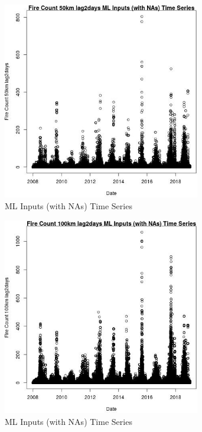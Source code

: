 \begin{figure} 
\centering  
\includegraphics[width=0.77\textwidth]{Code_Outputs/Report_ML_input_PM25_Step4_part_f_de_duplicated_aves_prioritize_24hr_obswNAs_Fire_Count_50km_lag2daysvDate.jpg} 
\caption{\label{fig:Report_ML_input_PM25_Step4_part_f_de_duplicated_aves_prioritize_24hr_obswNAsFire_Count_50km_lag2daysvDate}ML Inputs (with NAs) Time Series} 
\end{figure} 
 

\begin{figure} 
\centering  
\includegraphics[width=0.77\textwidth]{Code_Outputs/Report_ML_input_PM25_Step4_part_f_de_duplicated_aves_prioritize_24hr_obswNAs_Fire_Count_100km_lag2daysvDate.jpg} 
\caption{\label{fig:Report_ML_input_PM25_Step4_part_f_de_duplicated_aves_prioritize_24hr_obswNAsFire_Count_100km_lag2daysvDate}ML Inputs (with NAs) Time Series} 
\end{figure} 
 

